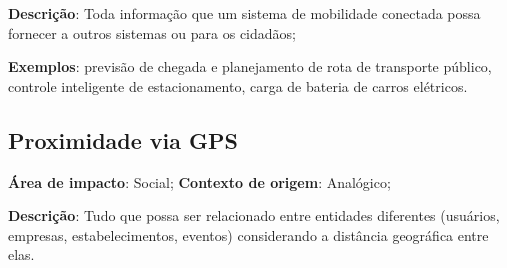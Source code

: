 \textbf{Descrição}: Toda informação que um sistema de mobilidade conectada possa fornecer a outros sistemas ou para os cidadãos;

\textbf{Exemplos}: previsão de chegada e planejamento de rota de transporte público, controle inteligente de estacionamento, carga de bateria de carros elétricos.

\subsection{Proximidade via GPS}

\textbf{Área de impacto}: Social; \textbf{Contexto de origem}: Analógico;

\textbf{Descrição}: Tudo que possa ser relacionado entre entidades diferentes (usuários, empresas, estabelecimentos, eventos) considerando a distância geográfica entre elas.